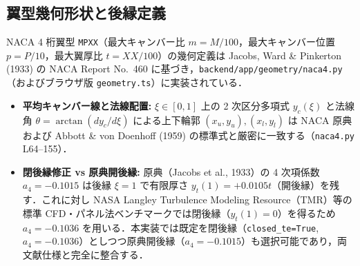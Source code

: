 \documentclass[10pt,a4paper]{article}
\begin{document}
\subsection{翼型幾何形状と後縁定義}
NACA 4 桁翼型 \texttt{MPXX}（最大キャンバー比 $m=M/100$，最大キャンバー位置 $p=P/10$，最大翼厚比 $t=XX/100$）の幾何定義は Jacobs, Ward \& Pinkerton (1933) の NACA Report No.\ 460 に基づき，\texttt{backend/app/geometry/naca4.py}（およびブラウザ版 \texttt{geometry.ts}）に実装されている．
\begin{itemize}\setlength{\itemsep}{2pt}\setlength{\parskip}{0pt}
  \item \textbf{平均キャンバー線と法線配置:} $\xi \in [0, 1]$ 上の 2 次区分多項式 $y_c(\xi)$ と法線角 $\theta = \arctan(dy_c/d\xi)$ による上下輪郭 $(x_u, y_u), (x_l, y_l)$ は NACA 原典および Abbott \& von Doenhoff (1959) の標準式と厳密に一致する（\texttt{naca4.py} L64--155）．
  \item \textbf{閉後縁修正 vs 原典開後縁:} 原典（Jacobs et al., 1933）の 4 次項係数 $a_4 = -0.1015$ は後縁 $\xi=1$ で有限厚さ $y_t(1) = +0.0105 t$（開後縁）を残す．これに対し NASA Langley Turbulence Modeling Resource（TMR）等の標準 CFD・パネル法ベンチマークでは閉後縁（$y_t(1)=0$）を得るため $a_4 = -0.1036$ を用いる．本実装では既定を閉後縁（\texttt{closed\_te=True}, $a_4=-0.1036$）としつつ原典開後縁（$a_4=-0.1015$）も選択可能であり，両文献仕様と完全に整合する．
\end{itemize}
\end{document}
